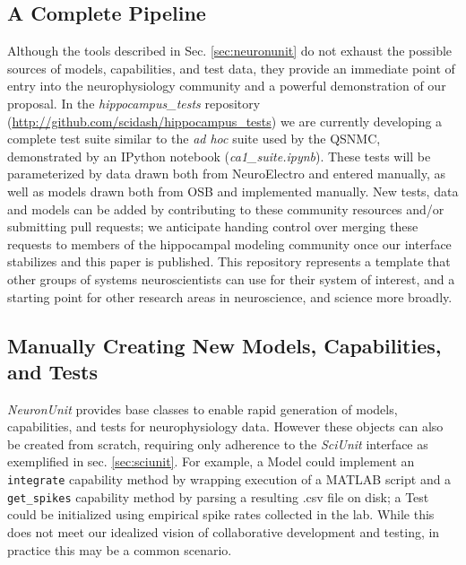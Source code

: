 \documentclass{frontiersSCNS}
\let\verbx\lstinline
\begin{document}
\subsection{A Complete Pipeline}
Although the tools described in Sec. \ref{sec:neuronunit} do not exhaust the possible sources of models, capabilities, and test data, they provide an immediate point of entry into the neurophysiology community and a powerful demonstration of our proposal. 
In the \textit{hippocampus\_tests} repository (\url{http://github.com/scidash/hippocampus\_tests}) we are currently developing a complete test suite similar to the \emph{ad hoc} suite used by the QSNMC, demonstrated by an IPython notebook (\textit{ca1\_suite.ipynb}). 
These tests will be parameterized by data drawn both from NeuroElectro and entered manually, as well as models drawn both from OSB and implemented manually. 
New tests, data and models can be added by contributing to these community resources and/or submitting pull requests; 
we anticipate handing control over merging these requests to members of the hippocampal modeling community once our interface stabilizes and this paper is published. 
This repository represents a template that other groups of systems neuroscientists can use for their system of interest, and a starting point for other research areas in neuroscience, and science more broadly.

\subsection{Manually Creating New Models, Capabilities, and Tests}
\textit{NeuronUnit} provides base classes to enable rapid generation of models, capabilities, and tests for neurophysiology data. 
However these objects can also be created from scratch, requiring only adherence to the \textit{SciUnit} interface as exemplified in sec. \ref{sec:sciunit}. 
For example, a Model could implement an \verbx{integrate} capability method by wrapping execution of a MATLAB script and a \verbx{get_spikes} capability method by parsing a resulting .csv file on disk; 
a Test could be initialized using empirical spike rates collected in the lab.  
While this does not meet our idealized vision of collaborative development and testing, in practice this may be a common scenario. 
\end{document}
